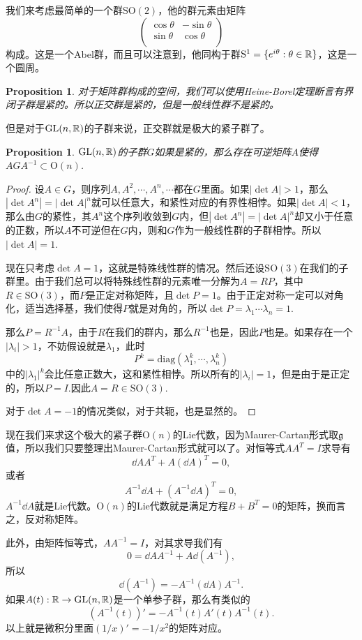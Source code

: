 \documentclass[8pt]{book}
\theoremstyle{plain}
\newtheorem{pro}[defi]{Proposition}
\newcommand{\lag}{{\mathfrak{g}}}  %
\begin{document}
我们来考虑最简单的一个群$\mathrm{SO}(2)$，他的群元素由矩阵
\[
	\begin{pmatrix}
	\cos \theta&-\sin \theta\\
	\sin \theta&\cos \theta\\
	\end{pmatrix}
\]
构成。这是一个Abel群，而且可以注意到，他同构于群$\mathrm{S}^1=\{e^{i\theta}:\theta\in\mathbb{R}\}$，这是一个圆周。
\begin{pro}
对于矩阵群构成的空间，我们可以使用Heine-Borel定理断言有界闭子群是紧的。所以正交群是紧的，但是一般线性群不是紧的。
\end{pro}
但是对于$\mathrm{GL}(n,\mathbb{R})$的子群来说，正交群就是极大的紧子群了。
\begin{pro}
$\mathrm{GL}(n,\mathbb{R})$的子群$G$如果是紧的，那么存在可逆矩阵$A$使得$AGA^{-1}\subset \mathrm{O}(n)$.
\end{pro}
\begin{proof}
设$A\in G$，则序列$A,A^2,\cdots,A^n,\cdots$都在$G$里面。如果$|\det A|>1$，那么$|\det A^n|=|\det A|^n$就可以任意大，和紧性对应的有界性相悖。如果$|\det A|<1$，那么由$G$的紧性，其$A^n$这个序列收敛到$G$内，但$|\det A^n|=|\det A|^n$却又小于任意的正数，所以$A$不可逆但在$G$内，则和$G$作为一般线性群的子群相悖。所以$|\det A|=1$.

现在只考虑$\det A=1$，这就是特殊线性群的情况。然后还设$\mathrm{SO}(3)$在我们的子群里。由于我们总可以将特殊线性群的元素唯一分解为$A=RP$，其中$R\in \mathrm{SO}(3)$，而$P$是正定对称矩阵，且$\det P=1$。由于正定对称一定可以对角化，适当选择基，我们使得$P$就是对角的，所以$\det P=\lambda_1\cdots\lambda_n=1$.

那么$P=R^{-1}A$，由于$R$在我们的群内，那么$R^{-1}$也是，因此$P$也是。如果存在一个$|\lambda_i|>1$，不妨假设就是$\lambda_1$，此时
\[
P^{k}=\mathrm{diag}(\lambda_1^k,\cdots,\lambda_n^k)
\]
中的$|\lambda_1|^k$会比任意正数大，这和紧性相悖。所以所有的$|\lambda_i|=1$，但是由于是正定的，所以$P=I$.因此$A=R\in\mathrm{SO}(3)$.

对于$\det A=-1$的情况类似，对于共轭，也是显然的。
\end{proof}

现在我们来求这个极大的紧子群$\mathrm{O}(n)$的Lie代数，因为Maurer-Cartan形式取$\lag$值，所以我们只要整理出Maurer-Cartan形式就可以了。对恒等式$AA^T=I$求导有
\[
	\dd A A^T+A(\dd A)^T=0,
\]
或者
\[
	A^{-1}\dd A+(A^{-1}\dd A)^T=0,
\]
$A^{-1}\dd A$就是Lie代数。$\mathrm{O}(n)$的Lie代数就是满足方程$B+B^T=0$的矩阵，换而言之，反对称矩阵。

此外，由矩阵恒等式，$AA^{-1}=I$，对其求导我们有
\[
0=\dd A A^{-1}+A\dd(A^{-1}),
\]
所以
\[
\dd(A^{-1})=-A^{-1}(\dd A) A^{-1}.
\]
如果$A(t):\mathbb{R} \to \mathrm{GL}(n,\mathbb{R})$是一个单参子群，那么有类似的
\[
(A^{-1}(t))'=-A^{-1}(t)A'(t) A^{-1}(t).
\]
以上就是微积分里面$(1/x)'=-1/x^2$的矩阵对应。
\end{document}
